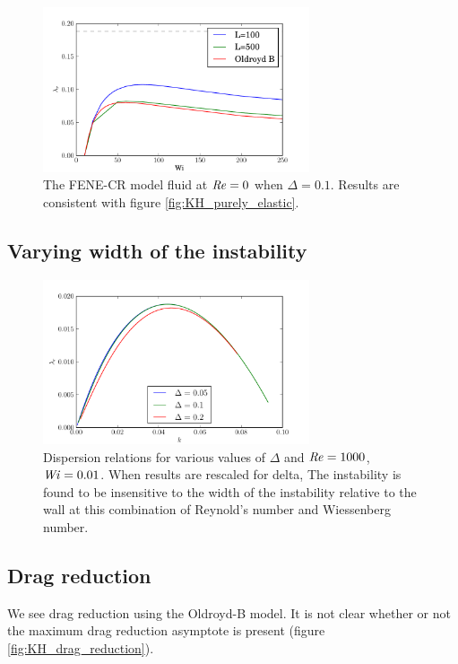 \documentclass{jfm}
\newcommand\Wi{\mbox{\textit{Wi}}}
\newcommand\Rey{\mbox{\textit{Re}}}  %
\begin{document}
\begin{figure}
    \centering
    \includegraphics[width=0.7\textwidth]{FENE_purely_elastic}
    \caption{The FENE-CR model fluid at $\Rey = 0$  when $\Delta = 0.1$. Results are consistent with figure \ref{fig:KH_purely_elastic}.}
    \label{fig:FENE_low_Re}
\end{figure}

\subsection{Varying width of the instability}

\begin{figure}
    \centering
    \includegraphics[width=0.7\textwidth]{high_Re_vary_delta}
    \caption{ Dispersion relations for various values of $\Delta$ and $\Rey = 1000$, $\Wi = 0.01$. When results are rescaled for delta, The instability is found to be insensitive to the width of the instability relative to the wall at this combination of Reynold's number and Wiessenberg number.}
    \label{fig:delta_dispersion}
\end{figure}


\subsection{Drag reduction}

We see drag reduction using the Oldroyd-B model. It is not clear whether or not the maximum drag reduction asymptote is present (figure \ref{fig:KH_drag_reduction}).
\end{document}
